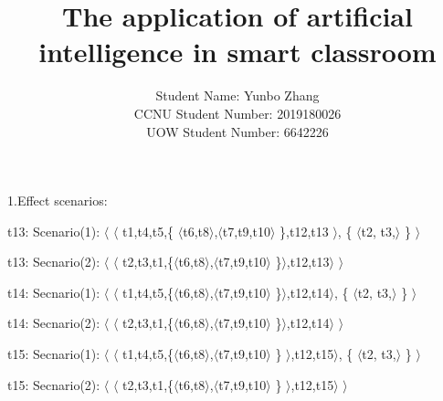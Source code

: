 \documentclass[runningheads]{llncs}
\begin{document}
\title{\large{The application of artificial intelligence in smart classroom}}

%
%
\author{\large{Student Name: Yunbo Zhang \\ %
CCNU Student Number: 2019180026 \\ %
UOW Student Number: 6642226}}  %







\maketitle


1.Effect scenarios:

t13: Scenario(1): $\langle$  $\langle$  t1,t4,t5,\{ $\langle$t6,t8$\rangle$,$\langle$t7,t9,t10$\rangle$ \},t12,t13 $\rangle$, \{  $\langle$t2, t3,$\rangle$   \}  $\rangle$

t13: Secnario(2): $\langle$  $\langle$  t2,t3,t1,\{$\langle$t6,t8$\rangle$,$\langle$t7,t9,t10$\rangle$ \}$\rangle$,t12,t13$\rangle$	$\rangle$

t14: Secnario(1): $\langle$  $\langle$  t1,t4,t5,\{$\langle$t6,t8$\rangle$,$\langle$t7,t9,t10$\rangle$ \}$\rangle$,t12,t14$\rangle$, \{  $\langle$t2, t3,$\rangle$   \}  $\rangle$

t14: Secnario(2): $\langle$  $\langle$  t2,t3,t1,\{$\langle$t6,t8$\rangle$,$\langle$t7,t9,t10$\rangle$ \}$\rangle$,t12,t14$\rangle$	$\rangle$

t15: Secnario(1): $\langle$  $\langle$  t1,t4,t5,\{$\langle$t6,t8$\rangle$,$\langle$t7,t9,t10$\rangle$ \} $\rangle$,t12,t15$\rangle$, \{  $\langle$t2, t3,$\rangle$   \}	$\rangle$

t15: Secnario(2): $\langle$  $\langle$  t2,t3,t1,\{$\langle$t6,t8$\rangle$,$\langle$t7,t9,t10$\rangle$ \} $\rangle$,t12,t15$\rangle$	$\rangle$
\end{document}
